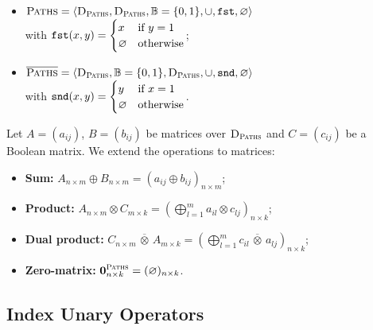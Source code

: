 \begin{itemize}
   \item $\textsc{Paths} = \langle \textsc{D}_{\textsc{Paths}}, \textsc{D}_{\textsc{Paths}}, \mathbb{B} = \{ 0, 1 \}, \cup, \texttt{fst}, \varnothing \rangle $ \\ 
		           with $\texttt{fst}(x, y) = \begin{cases} x & \text{if } y = 1 \\ \varnothing & \text{otherwise} \end{cases}$;
   \item $\overline{\textsc{Paths}} = \langle \textsc{D}_{\textsc{Paths}}, \mathbb{B} = \{ 0, 1 \}, \textsc{D}_{\textsc{Paths}}, \cup, \texttt{snd}, \varnothing \rangle$  \\ with  $\texttt{snd}(x, y) = \begin{cases} y & \text{if } x = 1 \\ \varnothing & \text{otherwise} \end{cases}$.
\end{itemize}

Let $A = (a_{ij})$, $B = (b_{ij})$ be matrices over $\textsc{D}_{\textsc{Paths}}$ and $C = (c_{ij})$ be a Boolean matrix. We extend the operations to matrices:
\begin{itemize}
	\item \textbf{Sum:} $A_{n \times m} \oplus B_{n \times m} = (a_{ij} \oplus b_{ij})_{n \times m}$;
	\item \textbf{Product:} $A_{n \times m} \otimes C_{m \times k} = (\bigoplus_{l=1}^m a_{il} \otimes c_{lj})_{n \times k}$;
	\item \textbf{Dual product:} $C_{n \times m} \,\overline{\otimes}\, A_{m \times k} = (\bigoplus_{l=1}^m c_{il} \,\overline{\otimes}\, a_{lj})_{n \times k}$;
  \item \textbf{Zero-matrix:} $\textbf{0}^{\textsc{Paths}}_{n \times k} = (\varnothing)_{n \times k}$.
\end{itemize}


\subsection{Index Unary Operators}

